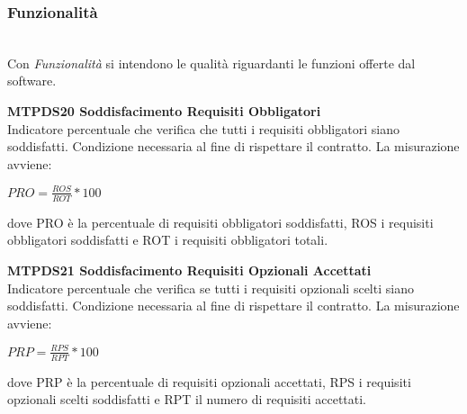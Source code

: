 \subsubsection{Funzionalità}\-\\
Con \textit{Funzionalità} si intendono le qualità riguardanti le funzioni offerte dal software.
\begin{itemize}
	\item \textbf{MTPDS20 Soddisfacimento Requisiti Obbligatori}\-\\
Indicatore percentuale che verifica che tutti i requisiti obbligatori siano soddisfatti. Condizione necessaria al fine di rispettare il contratto. La misurazione avviene:
\begin{center}
	\item $PRO = \frac{ROS}{ROT}*100$
\end{center}
dove PRO è la percentuale di requisiti obbligatori soddisfatti, ROS i requisiti obbligatori soddisfatti e ROT i requisiti obbligatori totali.

	\item \textbf{MTPDS21 Soddisfacimento Requisiti Opzionali Accettati}\-\\
Indicatore percentuale che verifica se tutti i requisiti opzionali scelti siano soddisfatti. Condizione necessaria al fine di rispettare il contratto. La misurazione avviene:
\begin{center}
	\item $PRP = \frac{RPS}{RPT}*100$
\end{center}
dove PRP è la percentuale di requisiti opzionali accettati, RPS i requisiti opzionali scelti soddisfatti e RPT il numero di requisiti accettati.
\end{itemize}

